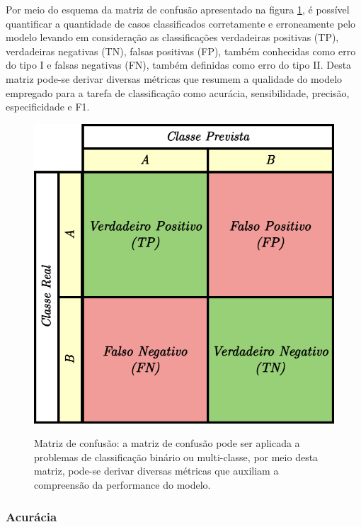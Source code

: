 Por meio do esquema da matriz de confusão apresentado na figura \ref{fig:matriz-de-confusao}, é possível quantificar a quantidade de casos classificados corretamente e erroneamente pelo modelo levando em consideração as classificações verdadeiras positivas (TP), verdadeiras negativas (TN), falsas positivas (FP), também conhecidas como erro do tipo I e falsas negativas (FN), também definidas como erro do tipo II.
Desta matriz pode-se derivar diversas métricas que resumem a qualidade do modelo empregado para a tarefa de classificação como acurácia, sensibilidade, precisão, especificidade e F1.

\begin{figure}[htbp]
	\centering
	\caption[Matriz de confusão]{Matriz de confusão: a matriz de confusão pode ser aplicada a problemas de classificação binário ou multi-classe, por meio desta matriz, pode-se derivar diversas métricas que auxiliam a compreensão da performance do modelo. }
		\includegraphics[scale=.25]{imagens/matriz-de-confusao.png}
	\label{fig:matriz-de-confusao}
\end{figure}

\subsubsection{Acurácia}

